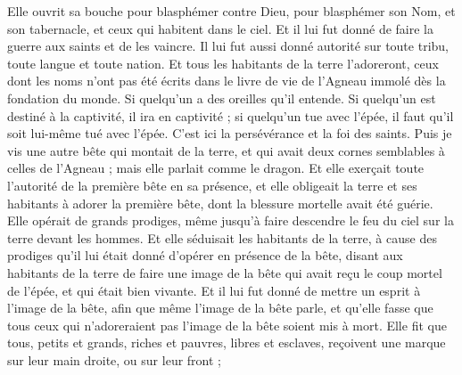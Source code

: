 \begin{multicols}{2}
Elle ouvrit sa bouche pour blasphémer contre Dieu, pour blasphémer son Nom, et son tabernacle, et ceux qui habitent dans le ciel.
Et il lui fut donné de faire la guerre aux saints et de les vaincre. Il lui fut aussi donné autorité sur toute tribu, toute langue et toute nation.
Et tous les habitants de la terre l'adoreront, ceux dont les noms n'ont pas été écrits dans le livre de vie de l'Agneau immolé dès la fondation du monde.
Si quelqu'un a des oreilles qu'il entende.
Si quelqu'un est destiné à la captivité, il ira en captivité ; si quelqu'un tue avec l'épée, il faut qu'il soit lui-même tué avec l'épée. C'est ici la persévérance et la foi des saints.
Puis je vis une autre bête qui montait de la terre, et qui avait deux cornes semblables à celles de l'Agneau ; mais elle parlait comme le dragon.
Et elle exerçait toute l'autorité de la première bête en sa présence, et elle obligeait la terre et ses habitants à adorer la première bête, dont la blessure mortelle avait été guérie.
Elle opérait de grands prodiges, même jusqu'à faire descendre le feu du ciel sur la terre devant les hommes.
Et elle séduisait les habitants de la terre, à cause des prodiges qu'il lui était donné d'opérer en présence de la bête, disant aux habitants de la terre de faire une image de la bête qui avait reçu le coup mortel de l'épée, et qui était bien vivante.
Et il lui fut donné de mettre un esprit à l'image de la bête, afin que même l'image de la bête parle, et qu'elle fasse que tous ceux qui n'adoreraient pas l'image de la bête soient mis à mort.
Elle fit que tous, petits et grands, riches et pauvres, libres et esclaves, reçoivent une marque sur leur main droite, ou sur leur front ;

\end{multicols}
